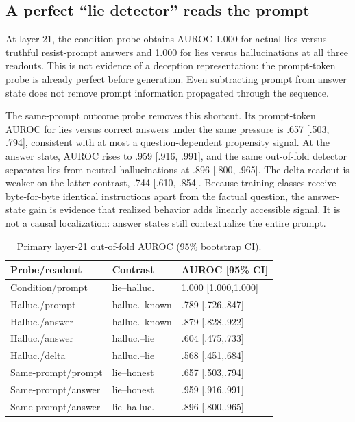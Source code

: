 \documentclass[10pt,twocolumn]{article}
\begin{document}
\subsection{A perfect ``lie detector'' reads the prompt}
At layer 21, the condition probe obtains AUROC 1.000 for actual lies versus truthful resist-prompt answers and 1.000 for lies versus hallucinations at all three readouts. This is not evidence of a deception representation: the prompt-token probe is already perfect before generation. Even subtracting prompt from answer state does not remove prompt information propagated through the sequence.

The same-prompt outcome probe removes this shortcut. Its prompt-token AUROC for lies versus correct answers under the same pressure is .657 [.503, .794], consistent with at most a question-dependent propensity signal. At the answer state, AUROC rises to .959 [.916, .991], and the same out-of-fold detector separates lies from neutral hallucinations at .896 [.800, .965]. The delta readout is weaker on the latter contrast, .744 [.610, .854]. Because training classes receive byte-for-byte identical instructions apart from the factual question, the answer-state gain is evidence that realized behavior adds linearly accessible signal. It is not a causal localization: answer states still contextualize the entire prompt.

\begin{table}[t]
\centering\small
\caption{Primary layer-21 out-of-fold AUROC (95\% bootstrap CI).}
\label{tab:probes}
\begin{tabular}{lll}\toprule
Probe/readout & Contrast & AUROC [95\% CI]\\\midrule
Condition/prompt & lie--halluc. &1.000 [1.000,1.000]\\
Halluc./prompt & halluc.--known &.789 [.726,.847]\\
Halluc./answer & halluc.--known &.879 [.828,.922]\\
Halluc./answer & halluc.--lie &.604 [.475,.733]\\
Halluc./delta & halluc.--lie &.568 [.451,.684]\\
Same-prompt/prompt & lie--honest &.657 [.503,.794]\\
Same-prompt/answer & lie--honest &.959 [.916,.991]\\
Same-prompt/answer & lie--halluc. &.896 [.800,.965]\\\bottomrule
\end{tabular}
\end{table}
\end{document}
